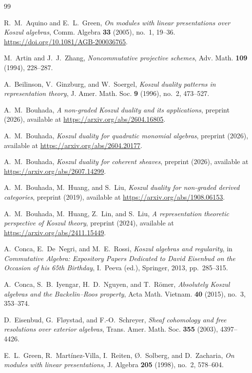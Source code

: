 \documentclass[11pt]{article}
\theoremstyle{definition}
\theoremstyle{remark}
\begin{document}
\begin{thebibliography}{99}

R.~M.~Aquino and E.~L.~Green,
\emph{On modules with linear presentations over Koszul algebras},
Comm. Algebra \textbf{33} (2005), no.~1, 19--36.
\url{https://doi.org/10.1081/AGB-200036765}.

M.~Artin and J.~J.~Zhang,
\emph{Noncommutative projective schemes},
Adv. Math. \textbf{109} (1994), 228--287.

A.~Beilinson, V.~Ginzburg, and W.~Soergel,
\emph{Koszul duality patterns in representation theory},
J. Amer. Math. Soc. \textbf{9} (1996), no.~2, 473--527.

A.~M.~Bouhada,
\emph{A non-graded Koszul duality and its applications},
preprint (2026), available at
\url{https://arxiv.org/abs/2604.16805}.

A.~M.~Bouhada,
\emph{Koszul duality for quadratic monomial algebras},
preprint (2026), available at
\url{https://arxiv.org/abs/2604.20177}.

A.~M.~Bouhada,
\emph{Koszul duality for coherent sheaves},
preprint (2026), available at
\url{https://arxiv.org/abs/2607.14299}.

A.~M.~Bouhada, M.~Huang, and S.~Liu,
\emph{Koszul duality for non-graded derived categories},
preprint (2019), available at
\url{https://arxiv.org/abs/1908.06153}.

A.~M.~Bouhada, M.~Huang, Z.~Lin, and S.~Liu,
\emph{A representation theoretic perspective of Koszul theory},
preprint (2024), available at
\url{https://arxiv.org/abs/2411.15449}.

A.~Conca, E.~De~Negri, and M.~E.~Rossi,
\emph{Koszul algebras and regularity},
in \emph{Commutative Algebra: Expository Papers Dedicated to David Eisenbud on the Occasion of his 65th Birthday},
I.~Peeva (ed.), Springer, 2013, pp.~285--315.

A.~Conca, S.~B.~Iyengar, H.~D.~Nguyen, and T.~R\"omer,
\emph{Absolutely Koszul algebras and the Backelin--Roos property},
Acta Math. Vietnam. \textbf{40} (2015), no.~3, 353--374.

D.~Eisenbud, G.~Fl{\o}ystad, and F.-O.~Schreyer,
\emph{Sheaf cohomology and free resolutions over exterior algebras},
Trans. Amer. Math. Soc. \textbf{355} (2003), 4397--4426.

E.~L.~Green, R.~Mart\'inez-Villa, I.~Reiten, {\O}.~Solberg, and D.~Zacharia,
\emph{On modules with linear presentations},
J. Algebra \textbf{205} (1998), no.~2, 578--604.


\end{thebibliography}
\end{document}
